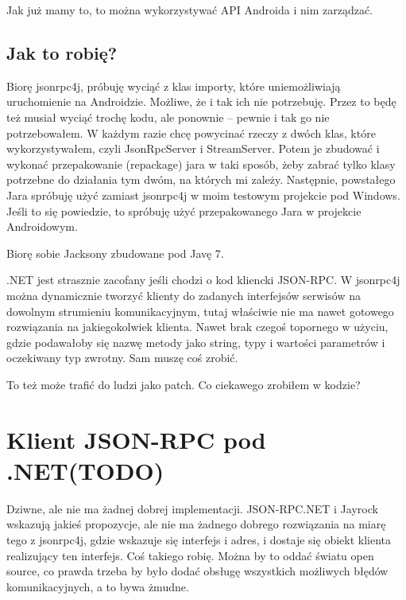 Jak już mamy to, to można wykorzystywać API Androida i nim zarządzać.

\subsection{Jak to robię?}
Biorę jsonrpc4j, próbuję wyciąć z klas importy, które uniemożliwiają uruchomienie na Androidzie. Możliwe, że i tak ich nie potrzebuję. Przez to będę też musiał wyciąć trochę kodu, ale ponownie -- pewnie i tak go nie potrzebowałem.
W każdym razie chcę powycinać rzeczy z dwóch klas, które wykorzystywałem, czyli JsonRpcServer i StreamServer. Potem je zbudować i wykonać przepakowanie (repackage) jara w taki sposób, żeby zabrać tylko klasy potrzebne do działania tym dwóm, na których mi zależy. Następnie, powstałego Jara spróbuję użyć zamiast jsonrpc4j w moim testowym projekcie pod Windows. Jeśli to się powiedzie, to spróbuję użyć przepakowanego Jara w projekcie Androidowym.

Biorę sobie Jacksony zbudowane pod Javę 7.

.NET jest strasznie zacofany jeśli chodzi o kod kliencki JSON-RPC. W jsonrpc4j można dynamicznie tworzyć klienty do zadanych interfejsów serwisów na dowolnym strumieniu komunikacyjnym, tutaj właściwie nie ma nawet gotowego rozwiązania na jakiegokolwiek klienta. Nawet brak czegoś topornego w użyciu, gdzie podawałoby się nazwę metody jako string, typy i wartości parametrów i oczekiwany typ zwrotny.
Sam muszę coś zrobić.

To też może trafić do ludzi jako patch.
Co ciekawego zrobiłem w kodzie?



\section{Klient JSON-RPC pod .NET(TODO)}
Dziwne, ale nie ma żadnej dobrej implementacji. JSON-RPC.NET i Jayrock wskazują jakieś propozycje, ale nie ma żadnego dobrego rozwiązania na miarę tego z jsonrpc4j, gdzie wskazuje się interfejs i adres, i dostaje się obiekt klienta realizujący ten interfejs.
Coś takiego robię. Można by to oddać światu open source, co prawda trzeba by było dodać obsługę wszystkich możliwych błędów komunikacyjnych, a to bywa żmudne.



